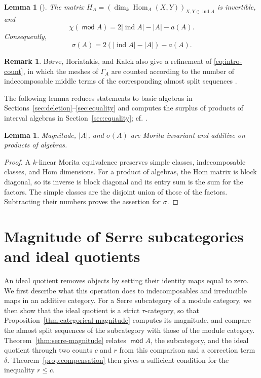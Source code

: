 \documentclass[a4paper,reqno,10pt]{amsart}
\newtheorem{lemma}[theorem]{Lemma}
\theoremstyle{definition}
\newtheorem{remark}[theorem]{Remark}
\numberwithin{equation}{section}
\DeclareMathOperator{\moduleCategory}{\mathsf{mod}}
\renewcommand{\mod}{\moduleCategory}
\DeclareMathOperator{\ind}{ind}
\DeclareMathOperator{\Hom}{Hom}
\begin{document}
\begin{lemma}[{\cite[Lemma~1.9]{BHK}}]\label{lem:count}
The matrix \(H_A=(\dim_k\Hom_A(X,Y))_{X,Y\in\ind A}\) is invertible, and
\[
 \chi(\mod A)=2|\ind A|-|A|-a(A).
\]
Consequently,
\begin{equation}\label{eq:count}
 \sigma(A)=2(|\ind A|-|A|)-a(A).
\end{equation}
\end{lemma}
\begin{remark}
B{\o}rve, Horiatakis, and Kalck also give a refinement of
\eqref{eq:intro-count}, in which the meshes of \(\Gamma_A\) are counted
according to the number of indecomposable middle terms of the
corresponding almost split sequences \cite[Lemma~1.13]{BHK}.
\end{remark}

The following lemma reduces statements to basic algebras in
Sections~\ref{sec:deletion}--\ref{sec:equality} and computes the surplus
of products of interval algebras in Section~\ref{sec:equality}; cf.
\cite[Remark~1.7(2)]{BHK}.
\begin{lemma}\label{lem:invariance}
Magnitude, \(|A|\), and \(\sigma(A)\) are Morita invariant and additive
on products of algebras.
\end{lemma}
\begin{proof}
A \(k\)-linear Morita equivalence preserves simple classes, indecomposable
classes, and Hom dimensions. For a product of algebras, the Hom matrix is
block diagonal, so its inverse is block diagonal and its entry sum is the
sum for the factors. The simple classes are the disjoint union of those of
the factors. Subtracting their numbers proves the assertion for \(\sigma\).
\end{proof}

\section{Magnitude of Serre subcategories and ideal quotients}\label{sec:quotient}
An ideal quotient removes objects by setting their identity maps equal to
zero. We first describe what this operation does to indecomposables and
irreducible maps in an additive category. For a Serre subcategory of a
module category, we then show that the ideal quotient is a strict
\(\tau\)-category, so that
Proposition~\ref{thm:categorical-magnitude} computes its magnitude, and
compare the almost split sequences of the subcategory with those of the
module category. Theorem~\ref{thm:serre-magnitude} relates \(\mod A\), the subcategory, and
the ideal quotient through two counts \(c\) and \(r\) from this comparison
and a correction term \(\delta\). Theorem~\ref{prop:compensation} then
gives a sufficient condition for the inequality \(r\leq c\).
\end{document}
